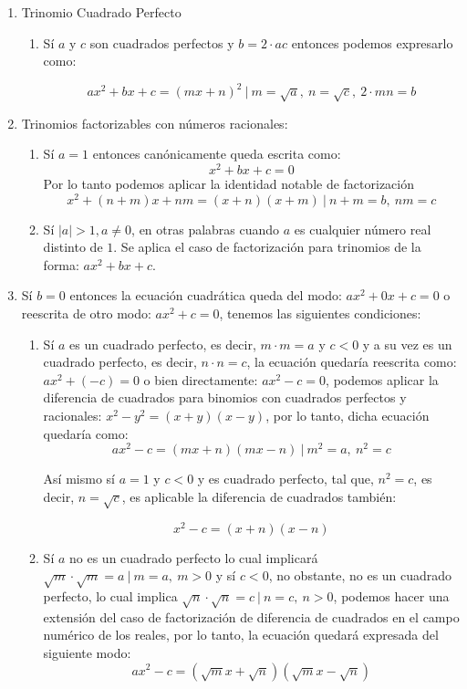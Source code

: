 \documentclass[A4paper, 10pt, oneside]{book}
\begin{document}
	\begin{enumerate}
		\item Trinomio Cuadrado Perfecto
		\begin{enumerate}
			\item Sí $a$ y $c$ son cuadrados perfectos y $b=2\cdot{ac}$ entonces podemos expresarlo como: 
			
			$$ax^2+bx+c=(mx+n)^2 \ | \ m=\sqrt{a},  \ n =\sqrt{c}, \ 2\cdot{mn} = b$$
		\end{enumerate}
		\item Trinomios factorizables con números racionales:
		\begin{enumerate}
			\item Sí $a = 1$ entonces canónicamente queda escrita como: $$x^2+bx+c=0$$ Por lo tanto podemos aplicar la identidad notable de factorización $$x^2+(n+m)x+nm=(x+n)(x+m) \ | \ n+m=b, \ nm = c$$
			
			\item Sí $|a|>1, a\neq 0$, en otras palabras cuando $a$ es cualquier número real distinto de $1$. Se aplica el caso de factorización para trinomios de la forma: $ax^2+bx+c$.
		\end{enumerate}
		
		\item Sí $b=0$ entonces la ecuación cuadrática queda del modo: $ax^2+0x+c=0$ o reescrita de otro modo: $ax^2+c=0$, tenemos las siguientes condiciones:
		
		\begin{enumerate}
			\item Sí $a$ es un cuadrado perfecto, es decir, $m\cdot{m} = a$ y $c < 0$ y a su vez es un cuadrado perfecto, es decir, $n\cdot{n} = c$, la ecuación quedaría reescrita como: $ax^2+(-c)=0$ o bien directamente: $ax^2-c=0$, podemos aplicar la diferencia de cuadrados para binomios con cuadrados perfectos y racionales: $x^2-y^2=(x+y)(x-y)$, por lo tanto, dicha ecuación quedaría como: $$ax^2-c=(mx+n)(mx-n) \ | \ m^2=a, \ n^2 = c$$
			
			Así mismo sí $a=1$ y $c<0$ y es cuadrado perfecto, tal que, $n^2=c$, es decir, $n=\sqrt{c}$, es aplicable la diferencia de cuadrados también: 
			
			$$x^2-c=(x+n)(x-n)$$
			
			\item Sí $a$ no es un cuadrado perfecto lo cual implicará $\sqrt{m}\cdot{\sqrt{m}}=a \ | \ m = a, \ m > 0$ y sí $c<0$, no obstante, no es un cuadrado perfecto, lo cual implica $\sqrt{n}\cdot{\sqrt{n}}=c \ | \ n = c, \ n > 0$, podemos hacer una extensión del caso de factorización de diferencia de cuadrados en el campo numérico de los reales, por lo tanto, la ecuación quedará expresada del siguiente modo: $$ax^2-c=\left(\sqrt{m}x+\sqrt{n}\right)\left(\sqrt{m}x-\sqrt{n}\right)$$
			

\end{enumerate}
\end{enumerate}
\end{document}

